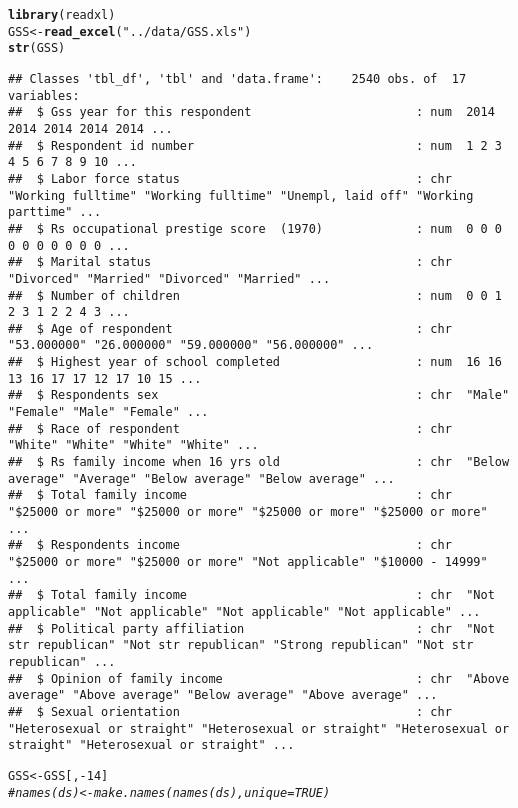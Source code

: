 \documentclass[fleqn,10pt,lineno]{wlpeerj}\usepackage[]{graphicx}\usepackage[]{color}
\makeatletter
\newcommand{\hlnum}[1]{\textcolor[rgb]{0.686,0.059,0.569}{#1}}%
\newcommand{\hlstr}[1]{\textcolor[rgb]{0.192,0.494,0.8}{#1}}%
\newcommand{\hlcom}[1]{\textcolor[rgb]{0.678,0.584,0.686}{\textit{#1}}}%
\newcommand{\hlopt}[1]{\textcolor[rgb]{0,0,0}{#1}}%
\newcommand{\hlstd}[1]{\textcolor[rgb]{0.345,0.345,0.345}{#1}}%
\newcommand{\hlkwb}[1]{\textcolor[rgb]{0.69,0.353,0.396}{#1}}%
\newcommand{\hlkwd}[1]{\textcolor[rgb]{0.737,0.353,0.396}{\textbf{#1}}}%
\newenvironment{kframe}{%
 \def\at@end@of@kframe{}%
 \ifinner\ifhmode%
  \def\at@end@of@kframe{\end{minipage}}%
  \begin{minipage}{\columnwidth}%
 \fi\fi%
 \def\FrameCommand##1{\hskip\@totalleftmargin \hskip-\fboxsep
 \colorbox{shadecolor}{##1}\hskip-\fboxsep
     \hskip-\linewidth \hskip-\@totalleftmargin \hskip\columnwidth}%
 \MakeFramed {\advance\hsize-\width
   \@totalleftmargin\z@ \linewidth\hsize
   \@setminipage}}%
 {\par\unskip\endMakeFramed%
 \at@end@of@kframe}
\newenvironment{knitrout}{}{} %
\makeatother
\begin{document}
\begin{knitrout}\footnotesize
{}\color{fgcolor}\begin{kframe}
\begin{alltt}
\hlkwd{library}\hlstd{(readxl)}
\hlstd{GSS} \hlkwb{<-} \hlkwd{read_excel}\hlstd{(}\hlstr{"../data/GSS.xls"}\hlstd{)}
\hlkwd{str}\hlstd{(GSS)}
\end{alltt}
\begin{verbatim}
## Classes 'tbl_df', 'tbl' and 'data.frame':	2540 obs. of  17 variables:
##  $ Gss year for this respondent                       : num  2014 2014 2014 2014 2014 ...
##  $ Respondent id number                               : num  1 2 3 4 5 6 7 8 9 10 ...
##  $ Labor force status                                 : chr  "Working fulltime" "Working fulltime" "Unempl, laid off" "Working parttime" ...
##  $ Rs occupational prestige score  (1970)             : num  0 0 0 0 0 0 0 0 0 0 ...
##  $ Marital status                                     : chr  "Divorced" "Married" "Divorced" "Married" ...
##  $ Number of children                                 : num  0 0 1 2 3 1 2 2 4 3 ...
##  $ Age of respondent                                  : chr  "53.000000" "26.000000" "59.000000" "56.000000" ...
##  $ Highest year of school completed                   : num  16 16 13 16 17 17 12 17 10 15 ...
##  $ Respondents sex                                    : chr  "Male" "Female" "Male" "Female" ...
##  $ Race of respondent                                 : chr  "White" "White" "White" "White" ...
##  $ Rs family income when 16 yrs old                   : chr  "Below average" "Average" "Below average" "Below average" ...
##  $ Total family income                                : chr  "$25000 or more" "$25000 or more" "$25000 or more" "$25000 or more" ...
##  $ Respondents income                                 : chr  "$25000 or more" "$25000 or more" "Not applicable" "$10000 - 14999" ...
##  $ Total family income                                : chr  "Not applicable" "Not applicable" "Not applicable" "Not applicable" ...
##  $ Political party affiliation                        : chr  "Not str republican" "Not str republican" "Strong republican" "Not str republican" ...
##  $ Opinion of family income                           : chr  "Above average" "Above average" "Below average" "Above average" ...
##  $ Sexual orientation                                 : chr  "Heterosexual or straight" "Heterosexual or straight" "Heterosexual or straight" "Heterosexual or straight" ...
\end{verbatim}
\begin{alltt}
\hlstd{GSS} \hlkwb{<-} \hlstd{GSS[,}\hlopt{-}\hlnum{14}\hlstd{]}
\hlcom{#names(ds) <- make.names(names(ds), unique=TRUE)}
\end{alltt}
\end{kframe}
\end{knitrout}
\end{document}
